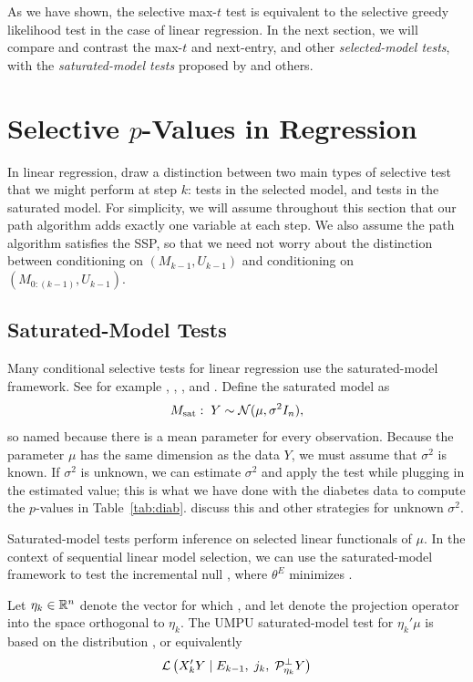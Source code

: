 \documentclass{article}
\begin{document}
As we have shown, the selective max-$t$ test is equivalent to the selective greedy likelihood test in the case of linear regression. In the next section, we will compare and contrast the max-$t$ and next-entry, and other {\em selected-model tests}, with the {\em saturated-model tests} proposed by \citet{taylor2014exact} and others. 

\section{Selective $p$-Values in Regression}
\label{sec:selective-reg}
In linear regression, \citet{fithian2014optimal} draw a distinction between two main types of selective test that we might perform at step $k$: tests in the selected model, and tests in the saturated model. For simplicity, we will assume throughout this section that our path algorithm adds exactly one variable at each step. We also assume the path algorithm satisfies the SSP, so that we need not worry about the distinction between conditioning on $(M_{k-1}, U_{k-1})$ and conditioning on $(M_{0:(k-1)}, U_{k-1})$.

\subsection{Saturated-Model Tests}
Many conditional selective tests for linear regression use the saturated-model framework. See for example \citet{taylor2013tests}, \citet{taylor2014exact}, \citet{lee2013exact}, and \citet{loftus2014significance}. Define the saturated model as
\[
M_{\text{sat}}:\; Y \sim \mathcal{N}(\mu, \sigma^2I_n),
\]
so named because there is a mean parameter for every observation. Because the parameter $\mu$ has the same dimension as the data $Y$, we must assume that $\sigma^2$ is known. If $\sigma^2$ is unknown, we can estimate $\sigma^2$ and apply the test while plugging in the estimated value; this is what we have done with the diabetes data to compute the $p$-values in Table~\ref{tab:diab}.  \citet{tibshirani2015uniform} discuss this and other strategies for unknown $\sigma^2$.

Saturated-model tests perform inference on selected linear functionals of $\mu$. In the context of sequential linear model selection,  we can use the saturated-model framework to test the incremental null , where $\theta^E$ minimizes .

Let $\eta_k\in \mathbb{R}^n$ denote the vector for which , and let  denote the projection operator into the space orthogonal to $\eta_k$. The UMPU saturated-model test for $\eta_k'\mu$ is based on the distribution , or equivalently
\begin{equation}\label{eq:satModel}
\mathcal{L}\left( X_k'Y \mid E_{k-1}, \;j_k, \;\mathcal{P}_{\eta_k}^\perp Y \right)
\end{equation}
\end{document}
